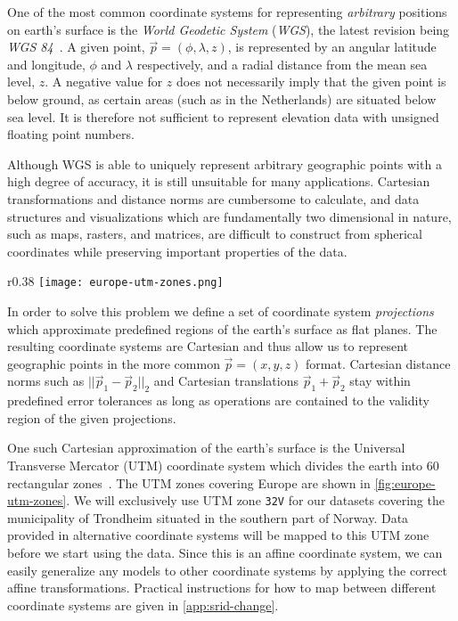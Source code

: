 One of the most common coordinate systems for representing \textit{arbitrary} positions on earth's surface is the \textit{World Geodetic System} (\textit{WGS}), the latest revision being \textit{WGS 84}~\cite{wgs84}.
A given point, $\vec{p} = (\phi, \lambda, z)$, is represented by an angular latitude and longitude, $\phi$ and $\lambda$ respectively, and a radial distance from the mean sea level, $z$.
A negative value for $z$ does not necessarily imply that the given point is below ground, as certain areas (such as in the Netherlands) are situated below sea level.
It is therefore not sufficient to represent elevation data with unsigned floating point numbers.

Although WGS is able to uniquely represent arbitrary geographic points with a high degree of accuracy, it is still unsuitable for many applications.
Cartesian transformations and distance norms are cumbersome to calculate, and data structures and visualizations which are fundamentally two dimensional in nature, such as maps, rasters, and matrices, are difficult to construct from spherical coordinates while preserving important properties of the data.

\begin{wrapfigure}[17]{r}{0.38\linewidth}
  \centering
  \texttt{[image: europe-utm-zones.png]}
  \caption[UTM zones covering Europe.]{%
    The figure shows the UTM zones required in order to cover the entirety of Europe, from \texttt{29S} to \texttt{38W}.
    This public domain image has been sourced from Wikimedia~\cite{wiki:europe_utm_zones}.
  }%
  \label{fig:europe-utm-zones}
\end{wrapfigure}

In order to solve this problem we define a set of coordinate system \textit{projections} which approximate predefined regions of the earth's surface as flat planes.
The resulting coordinate systems are Cartesian and thus allow us to represent geographic points in the more common $\vec{p} = (x, y, z)$ format.
Cartesian distance norms such as $||\vec{p}_1 - \vec{p}_2||_2$ and Cartesian translations $\vec{p}_1 + \vec{p}_2$ stay within predefined error tolerances as long as operations are contained to the validity region of the given projections.

One such Cartesian approximation of the earth's surface is the Universal Transverse Mercator (UTM) coordinate system which divides the earth into 60 rectangular zones~\cite[p.~48]{map-projections}. The UTM zones covering Europe are shown in \cref{fig:europe-utm-zones}.
We will exclusively use UTM zone \texttt{32V} for our datasets covering the municipality of Trondheim situated in the southern part of Norway.
Data provided in alternative coordinate systems will be mapped to this UTM zone before we start using the data.
Since this is an affine coordinate system, we can easily generalize any models to other coordinate systems by applying the correct affine transformations.
Practical instructions for how to map between different coordinate systems are given in \cref{app:srid-change}.
